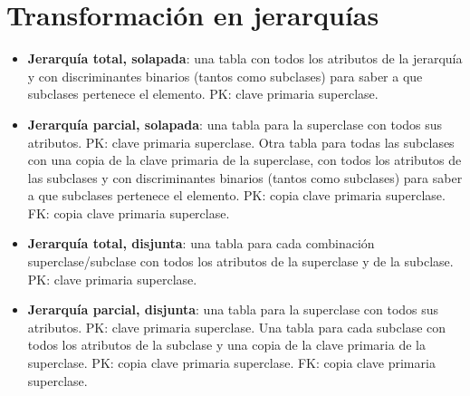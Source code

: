 \documentclass{article}
\begin{document}
\newpage

\section{Transformación en jerarquías}

\begin{itemize}
    \item \textbf{Jerarquía total, solapada}: una tabla con todos los atributos de la jerarquía y con discriminantes binarios (tantos como subclases) para saber a que subclases pertenece el elemento. PK: clave primaria superclase.

    \item \textbf{Jerarquía parcial, solapada}: una tabla para la superclase con todos sus atributos. PK: clave primaria superclase. Otra tabla para todas las subclases con una copia de la clave primaria de la superclase, con todos los atributos de las subclases y con discriminantes binarios (tantos como subclases) para saber a que subclases pertenece el elemento. PK: copia clave primaria superclase. FK: copia clave primaria superclase.

    \item \textbf{Jerarquía total, disjunta}: una tabla para cada combinación superclase/subclase con todos los atributos de la superclase y de la subclase. PK: clave primaria superclase.

    \item \textbf{Jerarquía parcial, disjunta}: una tabla para la superclase con todos sus atributos. PK: clave primaria superclase. Una tabla para cada subclase con todos los atributos de la subclase y una copia de la clave primaria de la superclase. PK: copia clave primaria superclase. FK: copia clave primaria superclase.
\end{itemize}

\begin{comment}
\begin{figure}[h]
    \centering
    \texttt{[image: 1.png]}
    \caption{}
\end{figure}
\end{comment}

\begin{comment}
\begin{wrapfigure}[]{r}{0.5\linewidth}
    \centering
    \texttt{[image: 8.png]}
    \caption{}
\end{wrapfigure}
\end{comment}
\end{document}
